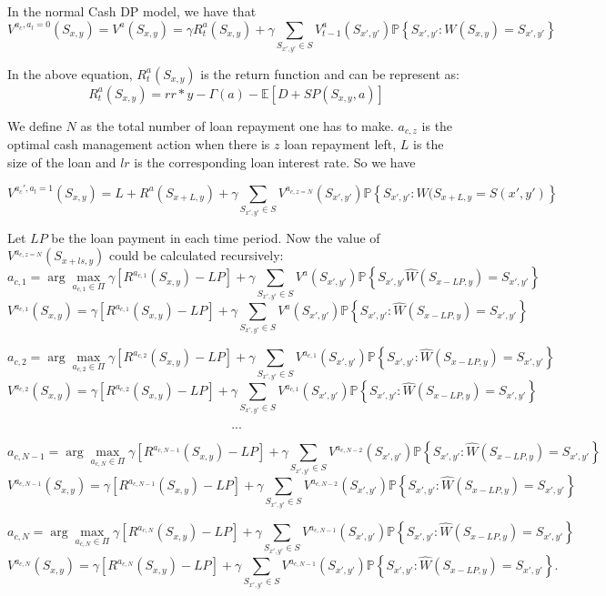 \documentclass[12pt]{article}
\begin{document}
In the normal Cash DP model, we have that $$V^{a_c, a_l =0}(S_{x,y})= V^a(S_{x,y}) =    \gamma R_t^{a}(S_{x,y}) + \gamma \sum_{S_{x',y'}\in S} V^{a}_{t-1}(S_{x',y'})
\mathbb{P}\left\{S_{x',y'}:W(S_{x, y}) = S_{x', y'} \right\}$$

In the above equation, $R^{a}_t(S_{x,y})$ is the return function and can be represent as:$$ R^{a}_t(S_{x,y}) = rr*y - \Gamma(a) - \mathbb{E}[D+SP(S_{x,y},a)]$$


We define $N$ as the total number of loan repayment one has to make. $a_{c, z}$ is the optimal cash management action when there is $z$ loan repayment left,  $L$ is the size of the loan and $lr$ is the corresponding loan interest rate. So we have 

$$V^{a_c', a_l = 1}(S_{x,y}) = L+R^{a}(S_{x+L,y}) + \gamma \sum_{S_{x',y'}\in S }V^{a_{c,z=N}}(S_{x',y'}) \mathbb{P}\left\{ S_{x',y'} : W(S_{x+L,y}=S(x',y')\right\}$$



Let $LP$ be the loan payment in each time period. Now the value of  $V^{a_{c,z=N}}(S_{x+ls, y})$ could be calculated recursively: 
$$a_{c,1} = \arg \max_{a_{c,1} \in \Pi} \gamma [R^{a_{c,1}} (S_{x,y}) - LP] + \gamma  \sum_{S_{x',y'}\in S} V^a(S_{x',y'})\mathbb{P}\left\{S_{x',y'}\widehat{W}(S_{x-LP, y}) = S_{x', y'} \right\}$$
$$ V^{a_{c,1}}(S_{x,y}) = \gamma [R^{a_{c,1}} (S_{x,y}) - LP] + \gamma  \sum_{S_{x',y'}\in S} V^a(S_{x',y'})\mathbb{P}\left\{S_{x',y'}:\widehat{W}(S_{x-LP, y}) = S_{x', y'} \right\}$$

$$a_{c,2} = \arg \max_{a_{c,2} \in \Pi} \gamma  [R^{a_{c,2}} (S_{x,y}) - LP]  + \gamma  \sum_{S_{x',y'}\in S} V^{a_{c,1}}(S_{x',y'}) \mathbb{P}\left\{S_{x',y'}:\widehat{W}(S_{x-LP, y}) = S_{x', y'} \right\}$$
$$ V^{a_{c,2}}(S_{x,y}) = \gamma  [R^{a_{c,2}} (S_{x,y}) - LP]   + \gamma  \sum_{S_{x',y'}\in S} V^{a_{c,1}}(S_{x',y'}) \mathbb{P}\left\{S_{x',y'}:\widehat{W}(S_{x-LP, y}) = S_{x', y'} \right\}$$

$$...$$

$$a_{c,N-1} = \arg \max_{a_{c,N} \in \Pi} \gamma [R^{a_{c,N-1}} (S_{x,y}) - LP] + \gamma  \sum_{S_{x',y'}\in S} V^{a_{c,N-2}}(S_{x',y'}) \mathbb{P}\left\{S_{x',y'}:\widehat{W}(S_{x-LP, y}) = S_{x', y'} \right\}$$
$$ V^{a_{c,N-1}}(S_{x,y}) = \gamma [R^{a_{c,N-1}} (S_{x,y}) - LP] + \gamma  \sum_{S_{x',y'}\in S} V^{a_{c,N-2}}(S_{x',y'}) \mathbb{P}\left\{S_{x',y'}:\widehat{W}(S_{x-LP, y}) = S_{x', y'} \right\}$$

$$a_{c,N} = \arg \max_{a_{c,N} \in \Pi} \gamma [R^{a_{c,N}} (S_{x,y}) - LP] + \gamma  \sum_{S_{x',y'}\in S} V^{a_{c,N-1}}(S_{x',y'}) \mathbb{P}\left\{S_{x',y'}:\widehat{W}(S_{x-LP, y}) = S_{x', y'} \right\}$$
$$ V^{a_{c,N}}(S_{x,y}) = \gamma [R^{a_{c,N}} (S_{x,y}) - LP] + \gamma  \sum_{S_{x',y'}\in S} V^{a_{c,N-1}}(S_{x',y'}) \mathbb{P}\left\{S_{x',y'}:\widehat{W}(S_{x-LP, y}) = S_{x', y'} \right\}.$$
\end{document}

